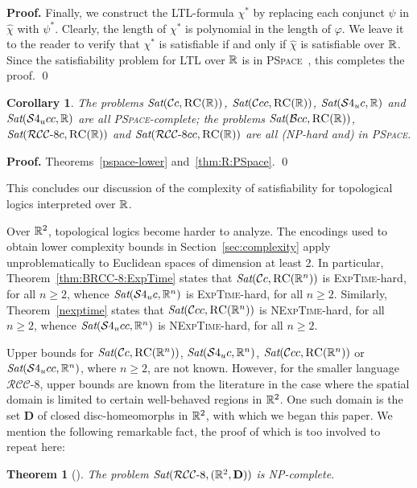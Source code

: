 \documentclass{LMCS}
\renewenvironment{proof}{\par\noindent\textbf{Proof.}}{\mbox{}\qed\par\medskip}
\theoremstyle{plain}
\newtheorem{theorem}[thm]{Theorem}
\newtheorem{corollary}[thm]{Corollary}
\newcommand{\cBC}{\ensuremath{\mathcal{C}}}
\newcommand{\cBCc}{\ensuremath{\cBC{}c}} \newcommand{\cBCcc}{\ensuremath{\cBC{}cc}}
\newcommand{\RCCE}{\ensuremath{\mathcal{RCC}\text{-}8}}\newcommand{\RCCEcc}{\ensuremath{\RCCE{}cc}}\newcommand{\RCCEc}{\ensuremath{\RCCE{}c}}
\newcommand{\Sat}{\textit{Sat}}
\newcommand{\NP}{\textsc{NP}}
\newcommand{\PSpace}{\textsc{PSpace}}
\newcommand{\ExpTime}{\textsc{ExpTime}}
\newcommand{\NExpTime}{\textsc{NExpTime}}
\begin{document}
\begin{proof}
Finally, we construct the LTL-formula $\chi^*$ by replacing each
conjunct $\psi$ in $\hat{\chi}$ with $\psi^*$. Clearly, the length of
$\chi^*$ is polynomial in the length of $\varphi$. We leave it to the
reader to verify that $\chi^*$ is satisfiable if and only if
$\hat{\chi}$ is satisfiable over $\mathbb{R}$. Since the
satisfiability problem for LTL over $\mathbb{R}$ is
in \PSpace~\cite{Reynolds-real}, this completes the proof.
\end{proof}

\begin{corollary}
The problems $\Sat(\cBCc,\RegC(\R))$, $\Sat(\cBCcc,\RegC(\R))$,
$\Sat(\conT,\R)$ and \linebreak
$\Sat(\conTc,\R)$ are all
\PSpace{}-complete\textup{;} the problems $\Sat(\cBcc,\RegC(\R))$,
$\Sat(\RCCEc,\RegC(\R))$ and $\Sat(\RCCEcc,\RegC(\R))$ are all \textup{(}\NP{}-hard
and\textup{)} in \PSpace{}.
\label{cor:hisLastBow}
\end{corollary}
\begin{proof}
Theorems~\ref{pspace-lower} and~\ref{thm:R:PSpace}.
\end{proof}

This concludes our discussion of the complexity of satisfiability for
topological logics interpreted over $\mathbb{R}$.



Over $\mathbb{R}^2$, topological logics become harder to analyze. The
encodings used to obtain lower complexity bounds in
Section~\ref{sec:complexity} apply unproblematically to Euclidean
spaces of dimension at least 2.  In particular,
Theorem~\ref{thm:BRCC-8:ExpTime} states that $\Sat(\cBCc,
\RegC(\R^n))$ is \ExpTime{}-hard, for all $n \geq 2$, whence
$\Sat(\conT,\R^n)$ is \ExpTime{}-hard, for all $n \geq 2$.  Similarly,
Theorem~\ref{nexptime} states that $\Sat(\cBCcc,\RegC(\R^n))$ is
\NExpTime{}-hard, for all $n \geq2$, whence $\Sat(\conTc,\R^n)$ is
\NExpTime{}-hard, for all $n \geq 2$.

Upper bounds for $\Sat(\cBCc, \RegC(\R^n))$, $\Sat(\conT,\R^n)$,
$\Sat(\cBCcc, \RegC(\R^n))$ or $\Sat(\conTc,\R^n)$, where $n \geq 2$,
are not known. However, for the smaller language $\RCCE$, upper bounds
are known from the literature in the case where the spatial domain is
limited to certain well-behaved regions in $\mathbb{R}^2$. One such domain is
the set $\mathbf{D}$ of closed disc-homeomorphs in $\mathbb{R}^2$, with which
we began this paper.  We mention the following remarkable fact, the
proof of which is too involved to repeat here:
\begin{theorem}[\cite{sss03}]\label{theo:SSS}
The problem $\Sat(\RCCE,(\R^2,\mathbf{D}))$ is \NP{}-complete.
\end{theorem}
\end{document}
